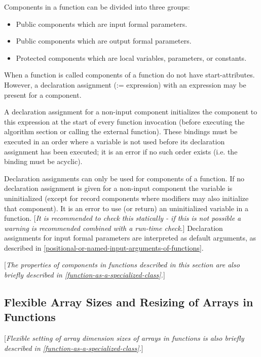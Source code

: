 \documentclass[10pt,a4paper]{report}
\def\doublelabel#1{\label{#1}}
\begin{document}
Components in a function can be divided into three groups:

\begin{itemize}
\item
  Public components which are input formal parameters.
\item
  Public components which are output formal parameters.
\item
  Protected components which are local variables, parameters, or
  constants.
\end{itemize}

When a function is called components of a function do not have
start-attributes. However, a declaration assignment (:= expression) with
an expression may be present for a component.

A declaration assignment for a non-input component initializes the
component to this expression at the start of every function invocation
(before executing the algorithm section or calling the external
function). These bindings must be executed in an order where a variable
is not used before its declaration assignment has been executed; it is
an error if no such order exists (i.e. the binding must be acyclic).

Declaration assignments can only be used for components of a function.
If no declaration assignment is given for a non-input component the
variable is uninitialized (except for record components where modifiers
may also initialize that component). It is an error to use (or return)
an uninitialized variable in a function. {[}\emph{It is recommended to
check this statically - if this is not possible a warning is recommended
combined with a run-time check}.{]} Declaration assignments for input
formal parameters are interpreted as default arguments, as described in
\ref{positional-or-named-input-arguments-of-functions}.

{[}\emph{The properties of components in functions described in this
section are also briefly described in \ref{function-as-a-specialized-class}.}{]}

\subsection{Flexible Array Sizes and Resizing of Arrays in Functions}\doublelabel{flexible-array-sizes-and-resizing-of-arrays-in-functions}

{[}\emph{Flexible setting of array dimension sizes of arrays in
functions is also briefly described in \ref{function-as-a-specialized-class}.}{]}
\end{document}
